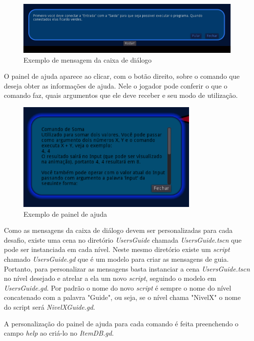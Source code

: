 \begin{figure}[H]
    \includegraphics[width=\textwidth]{../figuras/exemplo_users_guide.png}
    \caption{Exemplo de mensagem da caixa de diálogo}
\end{figure}

O painel de ajuda aparece ao clicar, com o botão direito, sobre o 
comando que deseja obter as informações de ajuda. Nele o jogador pode conferir 
o que o comando faz, quais argumentos que ele deve receber e seu modo de 
utilização.

\begin{figure}[H]
    \includegraphics[width=0.8\textwidth]{../figuras/exemplo_help_panel.png}
    \caption{Exemplo de painel de ajuda}
\end{figure}

Como as mensagens da caixa de diálogo devem ser personalizadas para cada desafio, 
existe uma cena no diretório \textit{UsersGuide} chamada \textit{UsersGuide.tscn}
que pode ser instanciada em cada nível. Neste mesmo diretório existe um 
\textit{script} chamado \textit{UsersGuide.gd} que é um modelo para criar as 
mensagens de guia. Portanto, para personalizar as mensagens basta instanciar a 
cena \textit{UsersGuide.tscn} no nível desejado e atrelar a ela um novo 
\textit{script}, seguindo o modelo em \textit{UsersGuide.gd}. Por padrão o nome 
do novo \textit{script} é sempre o nome do nível concatenado com a palavra 
"Guide", ou seja, se o nível chama "NivelX" o nome do script será 
\textit{NivelXGuide.gd}.

A personalização do painel de ajuda para cada comando é feita preenchendo o 
campo \textit{help} ao criá-lo no \textit{ItemDB.gd}.

